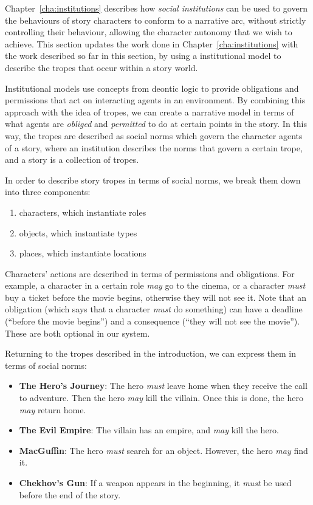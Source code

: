 \documentclass[11pt]{report}
\begin{document}
Chapter~\ref{cha:institutions} describes how \emph{social institutions} can be
used to govern the behaviours of story characters to conform to a narrative arc,
without strictly controlling their behaviour, allowing the character autonomy
that we wish to achieve. This section updates the work done in
Chapter~\ref{cha:institutions} with the work described so far in this section, by using a institutional model to describe the tropes that occur within a story world.

Institutional models use concepts from deontic logic to provide obligations and permissions that act on interacting agents in an environment. By combining this approach with the idea of tropes, we can create a narrative model in terms of what agents are \emph{obliged} and \emph{permitted} to do at certain points in the story. In this way, the tropes are described as social norms which govern the character agents of a story, where an institution describes the norms that govern a certain trope, and a story is a collection of tropes.

In order to describe story tropes in terms of social norms, we break them down into three components:

\begin{enumerate}
\item characters, which instantiate roles
\item objects, which instantiate types
\item places, which instantiate locations
\end{enumerate}

Characters' actions are described in terms of permissions and obligations. For example, a character in a certain role \emph{may} go to the cinema, or a character \emph{must} buy a ticket before the movie begins, otherwise they will not see it. Note that an obligation (which says that a character \emph{must} do something) can have a deadline (``before the movie begins'') and a consequence (``they will not see the movie''). These are both optional in our system.

Returning to the tropes described in the introduction, we can express them in terms of social norms:

\begin{itemize}
  \item \textbf{The Hero's Journey}: The hero \emph{must} leave home when they receive the call to adventure. Then the hero \emph{may} kill the villain. Once this is done, the hero \emph{may} return home.
  \item \textbf{The Evil Empire}: The villain has an empire, and \emph{may} kill the hero.
  \item \textbf{MacGuffin}: The hero \emph{must} search for an object. However, the hero \emph{may} find it.
  \item \textbf{Chekhov's Gun}: If a weapon appears in the beginning, it \emph{must} be used before the end of the story.
\end{itemize}
\end{document}
